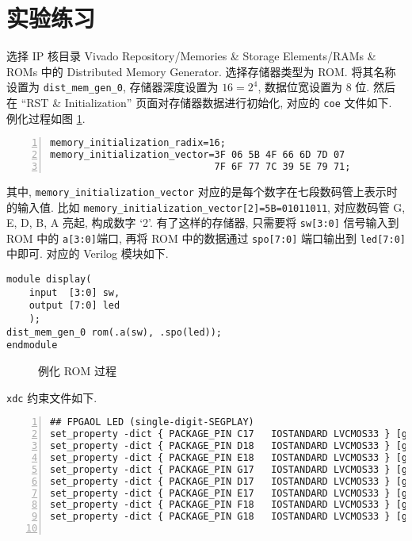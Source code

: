 \documentclass[UTF8,fontset=fandol]{ctexart}
\begin{document}
\section*{实验练习}
\begin{ExQuestions}
  \question 选择 IP 核目录 Vivado Repository/Memories \& Storage Elements/RAMs \& ROMs 中的 Distributed Memory Generator. 选择存储器类型为 ROM.
  将其名称设置为 \texttt{dist\_mem\_gen\_0}, 存储器深度设置为 $16=2^4$, 数据位宽设置为 8 位. 然后在 ``RST \& Initialization'' 页面对存储器数据进行初始化, 对应的 \texttt{coe} 文件如下. 例化过程如图 \ref{fig:dist_mem_gen_0}.
  \begin{lstlisting}[basicstyle=\ttfamily, numbers = left, frame=lrtb, frameround=tttt, caption={ROM 初始化 \texttt{coe} 文件内容}]
memory_initialization_radix=16;
memory_initialization_vector=3F 06 5B 4F 66 6D 7D 07 
                             7F 6F 77 7C 39 5E 79 71;
  \end{lstlisting}
  其中, \texttt{memory\_initialization\_vector} 对应的是每个数字在七段数码管上表示时的输入值. 比如 \texttt{memory\_initialization\_vector[2]=5B=01011011}, 对应数码管 G, E, D, B, A 亮起, 构成数字 `2'.
  有了这样的存储器, 只需要将 \texttt{sw[3:0]} 信号输入到 ROM 中的 \texttt{a[3:0]}端口, 再将 ROM 中的数据通过 \texttt{spo[7:0]} 端口输出到 \texttt{led[7:0]} 中即可. 对应的 Verilog 模块如下.
  \begin{lstlisting}[style=verilogstyle, caption={控制数码管显示的模块}]
module display(
    input  [3:0] sw,
    output [7:0] led
    );
dist_mem_gen_0 rom(.a(sw), .spo(led));
endmodule
  \end{lstlisting} 
  \newpage
  \begin{figure}[!htbp]
    \centering
    \caption{例化 ROM 过程}
    \label{fig:dist_mem_gen_0}
  \end{figure}
  \texttt{xdc} 约束文件如下.
  \begin{lstlisting}[basicstyle=\footnotesize\ttfamily, numbers = left, language = XML, frame=lrtb, frameround=tttt, caption={xdc 约束文件}]
## FPGAOL LED (single-digit-SEGPLAY)
set_property -dict { PACKAGE_PIN C17   IOSTANDARD LVCMOS33 } [get_ports { led[0] }];
set_property -dict { PACKAGE_PIN D18   IOSTANDARD LVCMOS33 } [get_ports { led[1] }];
set_property -dict { PACKAGE_PIN E18   IOSTANDARD LVCMOS33 } [get_ports { led[2] }];
set_property -dict { PACKAGE_PIN G17   IOSTANDARD LVCMOS33 } [get_ports { led[3] }];
set_property -dict { PACKAGE_PIN D17   IOSTANDARD LVCMOS33 } [get_ports { led[4] }];
set_property -dict { PACKAGE_PIN E17   IOSTANDARD LVCMOS33 } [get_ports { led[5] }];
set_property -dict { PACKAGE_PIN F18   IOSTANDARD LVCMOS33 } [get_ports { led[6] }];
set_property -dict { PACKAGE_PIN G18   IOSTANDARD LVCMOS33 } [get_ports { led[7] }];


\end{lstlisting}
\end{ExQuestions}
\end{document}
